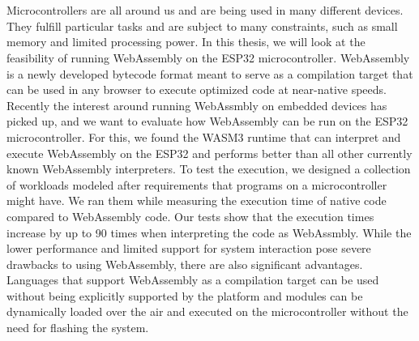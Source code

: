 \chapter{\abstractname}

Microcontrollers are all around us and are being used in many different devices. They fulfill particular tasks and are subject to many constraints, such as small memory and limited processing power. In this thesis, we will look at the feasibility of running WebAssembly on the ESP32 microcontroller. WebAssembly is a newly developed bytecode format meant to serve as a compilation target that can be used in any browser to execute optimized code at near-native speeds. Recently the interest around running WebAssmbly on embedded devices has picked up, and we want to evaluate how WebAssembly can be run on the ESP32 microcontroller. For this, we found the WASM3 runtime that can interpret and execute WebAssembly on the ESP32 and performs better than all other currently known WebAssembly interpreters. To test the execution, we designed a collection of workloads modeled after requirements that programs on a microcontroller might have. We ran them while measuring the execution time of native code compared to WebAssembly code. Our tests show that the execution times increase by up to 90 times when interpreting the code as WebAssmbly. While the lower performance and limited support for system interaction pose severe drawbacks to using WebAssembly, there are also significant advantages. Languages that support WebAssembly as a compilation target can be used without being explicitly supported by the platform and modules can be dynamically loaded over the air and executed on the microcontroller without the need for flashing the system.
